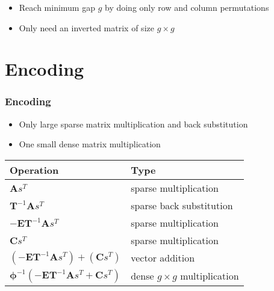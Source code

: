 \documentclass[	%
				]{beamer}
\begin{document}
\begin{frame}[fragile]
	\begin{itemize}
		\item Reach minimum gap $g$ by doing only row and column permutations
		\item Only need an inverted matrix of size $g \times g$
	\end{itemize}
\end{frame}


\section{Encoding}
\begin{frame}
	\frametitle{Encoding}
	\begin{itemize}
		\item Only large sparse matrix multiplication and back substitution
		\item One small dense matrix multiplication
	\end{itemize}
	\begin{tabular}{l l}
		Operation & Type \\ \toprule
		$\bm{A}s^T$ & sparse multiplication \\
		$\bm{T}^{-1}\bm{A}s^T$ & sparse back substitution \\
		$-\bm{E}\bm{T}^{-1}\bm{A}s^T$ & sparse multiplication \\
		$\bm{C}s^T$ & sparse multiplication \\
		$\left(-\bm{E}\bm{T}^{-1}\bm{A}s^T\right) + \left(\bm{C}s^T\right)$ & vector addition \\
		$\bm{\phi}^{-1}\left(-\bm{E}\bm{T}^{-1}\bm{A}s^T + \bm{C}s^T\right)$ & dense $g\times g$ multiplication\\
	\end{tabular}
\end{frame}
\end{document}
